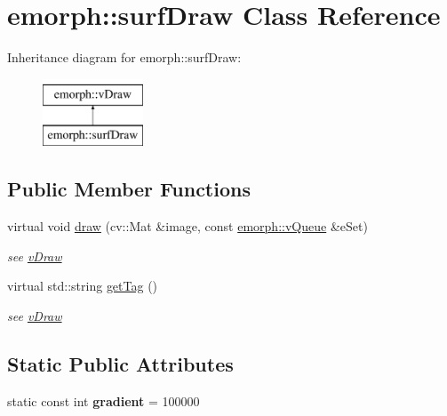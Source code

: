 \hypertarget{classemorph_1_1surfDraw}{\section{emorph\-:\-:surf\-Draw Class Reference}
\label{classemorph_1_1surfDraw}
}
Inheritance diagram for emorph\-:\-:surf\-Draw\-:\begin{figure}[H]
\begin{center}
\leavevmode
\includegraphics[height=2.000000cm]{classemorph_1_1surfDraw}
\end{center}
\end{figure}
\subsection*{Public Member Functions}
\begin{DoxyCompactItemize}
\item 
\hypertarget{classemorph_1_1surfDraw_a3b448daead5d0bbc9e61fdc0022c0c8b}{virtual void \hyperlink{classemorph_1_1surfDraw_a3b448daead5d0bbc9e61fdc0022c0c8b}{draw} (cv\-::\-Mat \&image, const \hyperlink{classemorph_1_1vQueue}{emorph\-::v\-Queue} \&e\-Set)}\label{classemorph_1_1surfDraw_a3b448daead5d0bbc9e61fdc0022c0c8b}

\begin{DoxyCompactList}\small\item\em see \hyperlink{classemorph_1_1vDraw}{v\-Draw} \end{DoxyCompactList}\item 
\hypertarget{classemorph_1_1surfDraw_aa65dc027fd2d96a01218230525f270e2}{virtual std\-::string \hyperlink{classemorph_1_1surfDraw_aa65dc027fd2d96a01218230525f270e2}{get\-Tag} ()}\label{classemorph_1_1surfDraw_aa65dc027fd2d96a01218230525f270e2}

\begin{DoxyCompactList}\small\item\em see \hyperlink{classemorph_1_1vDraw}{v\-Draw} \end{DoxyCompactList}\end{DoxyCompactItemize}
\subsection*{Static Public Attributes}
\begin{DoxyCompactItemize}
\item 
\hypertarget{classemorph_1_1surfDraw_a05f4f4b2a0840868f1a88dfe3e50ee8e}{static const int {\bfseries gradient} = 100000}\label{classemorph_1_1surfDraw_a05f4f4b2a0840868f1a88dfe3e50ee8e}

\end{DoxyCompactItemize}
